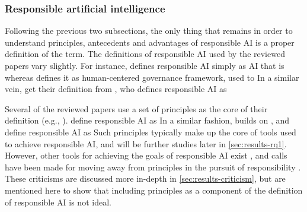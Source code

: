 \subsubsection{Responsible artificial intelligence}
\label{sec:definition-responsibleAI}
Following the previous two subsections, the only thing that remains in order to understand principles, antecedents and advantages of responsible AI is a proper definition of the term. The definitions of responsible AI used by the reviewed papers vary slightly. For instance, \textcite[p. 6]{Doorn_2021} defines responsible AI simply as AI that is  whereas \textcite[p. 4964]{WangY_2020} defines it as human-centered governance framework, used to  In a similar vein, \textcite[p. 58-59]{Papagiannidis_2022} get their definition from \textcite{Singapore_framework}, who defines responsible AI as  %

Several of the reviewed papers use a set of principles as the core of their definition (e.g., \cite{WangW_2021,Cheng_2021}). \textcite[p. 83]{BarredoArrieta_2020} define responsible AI as  In a similar fashion, \textcite[p. 258]{Mikalef_2022} builds on \textcite{Accenture_AIservices}, and define responsible AI as  Such principles typically make up the core of tools used to achieve responsible AI, and will be further studies later in \autoref{sec:results-rq1}. However, other tools for achieving the goals of responsible AI exist \parencite{Werder_2022}, and calls have been made for moving away from principles in the pursuit of responsibility \parencite{Henriksen_2021}. These criticisms are discussed more in-depth in \autoref{sec:results-criticism}, but are mentioned here to show that including principles as a component of the definition of responsible AI is not ideal.

